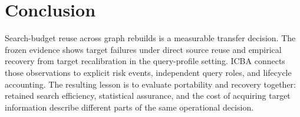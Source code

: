 \section{Conclusion}
\label{sec:conclusion}
Search-budget reuse across graph rebuilds is a measurable transfer decision. The frozen evidence shows target failures under direct source reuse and empirical recovery from target recalibration in the query-profile setting. ICBA connects those observations to explicit risk events, independent query roles, and lifecycle accounting. The resulting lesson is to evaluate portability and recovery together: retained search efficiency, statistical assurance, and the cost of acquiring target information describe different parts of the same operational decision.
